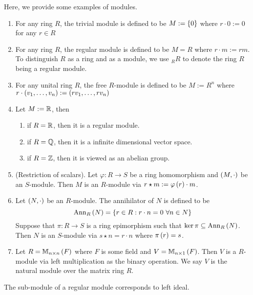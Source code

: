 \begin{ex}
    Here, we provide some examples of modules.
    \begin{enumerate}
        \item For any ring $R$, the trivial module is defined to be $M:=\left\{0\right\}$ where $r\cdot 0:= 0$ for any $r\in R$
        \item For any ring $R$, the regular module is defined to be $M=R$ where $r\cdot m:= rm$. To distinguish $R$ as a ring and as a module, we use $_RR$ to denote the ring $R$ being a regular module.
        \item For any unital ring $R$, the free $R$-module is defined to be $M:= R^n$ where $r\cdot \left(v_1, \dots, v_n\right) := \left(rv_1, \dots, rv_n\right)$
        \item Let $M:= {\mathbb R}$, then
        \begin{enumerate}
            \item if $R={\mathbb R}$, then it is a regular module.
            \item if $R={\mathbb Q}$, then it is a infinite dimensional vector space.
            \item if $R={\mathbb Z}$, then it is viewed as an abelian group.
        \end{enumerate}
        \item (Restriction of scalars). Let $\varphi:R\to S$ be a ring homomorphism and $\left(M,\cdot\right)$ be an $S$-module. Then $M$ is an $R$-module via $r\star m := \varphi\left(r\right)\cdot m$.
        \item Let $\left(N, \cdot\right)$ be an $R$-module. The annihilator of $N$ is defined to be
        \[\operatorname{Ann}_R\left(N\right)=\left\{r\in R:r\cdot n =0\  \forall n\in N \right\}\]
        Suppose that $\pi:R\to S$ is a ring epimorphism such that $\ker \pi\subseteq \operatorname{Ann}_R\left(N\right)$. Then $N$ is an $S$-module via $s\star n= r\cdot n$ where $\pi\left(r\right)=s$.
        \item Let $R= \mathbb M_{n\times n}\left(F\right)$ where $F$ is some field and $V = \mathbb M_{n\times 1}\left(F\right)$. Then $V$ is a $R$-module via left multiplication as the binary operation. We say $V$ is the natural module over the matrix ring $R$.
    \end{enumerate}
\end{ex}

\medskip

\begin{re}
    The sub-module of a regular module corresponds to left ideal.
\end{re}

\medskip

